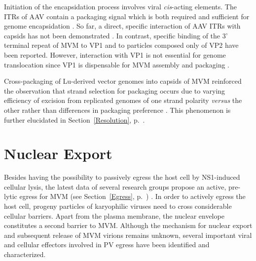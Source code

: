 Initiation of the encapsidation process involves viral \textit{cis}-acting elements. The ITRs of AAV contain a packaging signal which is both required and sufficient for genome encapsidation \cite{pmid2547998}. So far, a direct, specific interaction of AAV ITRs with capsids has not been demonstrated \cite{pmid8627687, pmid9060669}. In contrast, specific binding of the 3' terminal repeat of MVM to VP1 \cite{pmid1870193} and to particles composed only of VP2 \cite{pmid8350419} have been reported. However, interaction with VP1 is not essential for genome translocation since VP1 is dispensable for MVM assembly and packaging \cite{pmid8416366}.      

Cross-packaging of Lu-derived vector genomes into capsids of MVM reinforced the observation that strand selection for packaging occurs due to varying efficiency of excision from replicated genomes of one strand polarity \textit{versus} the other rather than differences in packaging preference \cite{pmid15866075}. This phenomenon is further elucidated in Section~\ref{Resolution}, p.~\pageref{Resolution}.   
\label{Packaging1} 

\section{Nuclear Export}
\label{Export}
Besides having the possibility to passively egress the host cell by NS1-induced cellular lysis, the latest data of several research groups propose an active, pre-lytic egress for MVM (see Section~\ref{Egress}, p.~\pageref{Egress}) \cite{pmid24068925, pmid18704167, pmid15367635}. In order to actively egress the host cell, progeny particles of karyophilic viruses need to cross considerable cellular barriers. Apart from the plasma membrane, the nuclear envelope constitutes a second barrier to MVM. Although the mechanism for nuclear export and subsequent release of MVM virions remains unknown, several important viral and cellular effectors involved in PV egress have been identified and characterized. 

